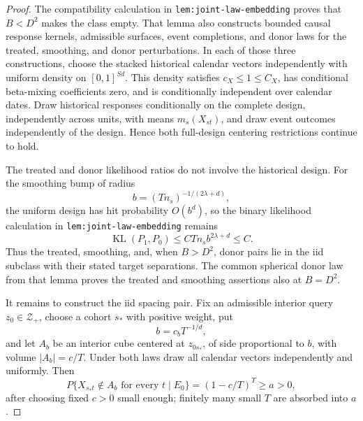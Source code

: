 \documentclass{article}
\begin{document}
\begin{proof}
The compatibility calculation in \texttt{lem:joint-law-embedding} proves that \(B<D^2\) makes the class empty.  That lemma also constructs bounded causal response kernels, admissible surfaces, event completions, and donor laws for the treated, smoothing, and donor perturbations.  In each of those three constructions, choose the stacked historical calendar vectors independently with uniform density on \([0,1]^{Sd}\).  This density satisfies \(c_X\leq1\leq C_X\), has conditional beta-mixing coefficients zero, and is conditionally independent over calendar dates.  Draw historical responses conditionally on the complete design, independently across units, with means \(m_s(X_{st})\), and draw event outcomes independently of the design.  Hence both full-design centering restrictions continue to hold.

The treated and donor likelihood ratios do not involve the historical design.  For the smoothing bump of radius
\[
b=(Tn_s)^{-1/(2\lambda+d)},
\]
the uniform design has hit probability \(O(b^d)\), so the binary likelihood calculation in \texttt{lem:joint-law-embedding} remains
\[
\operatorname{KL}(P_1,P_0)
\leq CTn_sb^{2\lambda+d}\leq C.
\tag{93}
\]
Thus the treated, smoothing, and, when \(B>D^2\), donor pairs lie in the iid subclass with their stated target separations.  The common spherical donor law from that lemma proves the treated and smoothing assertions also at \(B=D^2\).

It remains to construct the iid spacing pair.  Fix an admissible interior query \(z_0\in\mathcal Z_+\), choose a cohort \(s_*\) with positive weight, put
\[
b=c_bT^{-1/d},
\]
and let \(A_b\) be an interior cube centered at \(z_{0s_*}\), of side proportional to \(b\), with volume \(|A_b|=c/T\).  Under both laws draw all calendar vectors independently and uniformly.  Then
\[
P\{X_{s_*t}\notin A_b\text{ for every }t\mid E_0\}
=(1-c/T)^T\geq a>0,
\tag{94}
\]
after choosing fixed \(c>0\) small enough; finitely many small \(T\) are absorbed into \(a\).


\end{proof}
\end{document}
